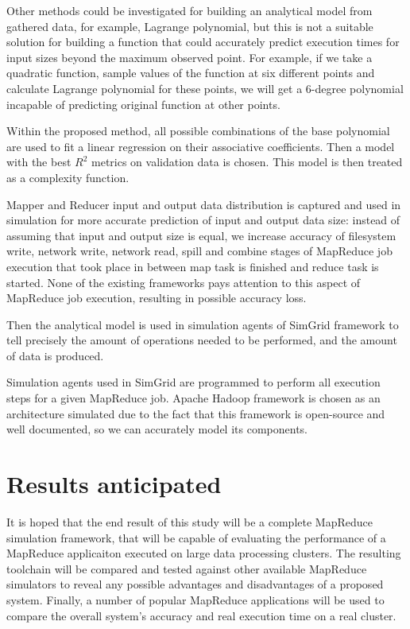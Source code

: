 \documentclass[conference]{IEEEtran} \IEEEoverridecommandlockouts
\begin{document}
    Other methods could be investigated for building an analytical model from
    gathered data, for example, Lagrange polynomial, but this is not a suitable
    solution for building a function that could accurately predict execution
    times for input sizes beyond the maximum observed point. For example, if we
    take a quadratic function, sample values of the function at six different
    points and calculate Lagrange polynomial for these points, we will get a
    6-degree polynomial incapable of predicting original function at other
    points. 

    Within the proposed method, all possible combinations of the base
    polynomial are used to fit a linear regression on their associative
    coefficients. Then a model with the best $R^2$ metrics on validation data
    is chosen. This model is then treated as a complexity function.

    Mapper and Reducer input and output data distribution is captured and used
    in simulation for more accurate prediction of input and output data size:
    instead of assuming that input and output size is equal, we increase
    accuracy of filesystem write, network write, network read, spill and
    combine stages of MapReduce job execution that took place in between map
    task is finished and reduce task is started. None of the existing
    frameworks pays attention to this aspect of MapReduce job execution,
    resulting in possible accuracy loss. 

    Then the analytical model is used in simulation agents of
    SimGrid\cite{simgrid} framework to tell precisely the amount of operations
    needed to be performed, and the amount of data is produced.

    Simulation agents used in SimGrid are programmed to perform all execution
    steps for a given MapReduce job. Apache Hadoop framework is chosen as an
    architecture simulated due to the fact that this framework is open-source
    and well documented, so we can accurately model its components. 


    \section{Results anticipated}

    It is hoped that the end result of this study will be a complete MapReduce
    simulation framework, that will be capable of evaluating the performance of
    a MapReduce applicaiton executed on large data processing clusters. The
    resulting toolchain will be compared and tested against other available
    MapReduce simulators to reveal any possible advantages and disadvantages of
    a proposed system. Finally, a number of popular MapReduce applications will
    be used to compare the overall system's accuracy and real execution time on
    a real cluster. 
\end{document}
